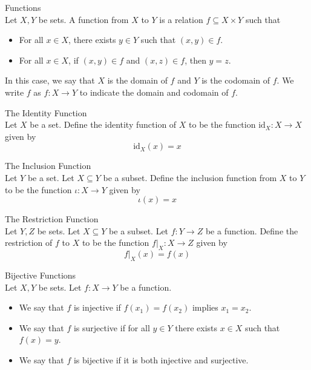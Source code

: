\documentclass[a4paper]{article}
\begin{document}
\begin{defn}{Functions}{}\\
Let $X,Y$ be sets. A function from $X$ to $Y$ is a relation $f\subseteq X\times Y$ such that
\begin{itemize}
\item For all $x\in X$, there exists $y\in Y$ such that $(x,y)\in f$. 
\item For all $x\in X$, if $(x,y)\in f$ and $(x,z)\in f$, then $y=z$. 
\end{itemize}
In this case, we say that $X$ is the domain of $f$ and $Y$ is the codomain of $f$. We write $f$ as $f:X\to Y$ to indicate the domain and codomain of $f$. 
\end{defn}

\begin{defn}{The Identity Function}{}\\
Let $X$ be a set. Define the identity function of $X$ to be the function $\text{id}_X:X\to X$ given by $$\text{id}_X(x)=x$$
\end{defn}

\begin{defn}{The Inclusion Function}{}\\
Let $Y$ be a set. Let $X\subseteq Y$ be a subset. Define the inclusion function from $X$ to $Y$ to be the function $\iota:X\to Y$ given by $$\iota(x)=x$$
\end{defn}

\begin{defn}{The Restriction Function}{}\\
Let $Y,Z$ be sets. Let $X\subseteq Y$ be a subset. Let $f:Y\to Z$ be a function. Define the restriction of $f$ to $X$ to be the function $f|_X:X\to Z$ given by $$f|_X(x)=f(x)$$
\end{defn}

\begin{defn}{Bijective Functions}{}\\
Let $X,Y$ be sets. Let $f:X\to Y$ be a function. 
\begin{itemize}
\item We say that $f$ is injective if $f(x_1)=f(x_2)$ implies $x_1=x_2$. 
\item We say that $f$ is surjective if for all $y\in Y$ there exists $x\in X$ such that $f(x)=y$. 
\item We say that $f$ is bijective if it is both injective and surjective. 
\end{itemize}
\end{defn}
\end{document}
